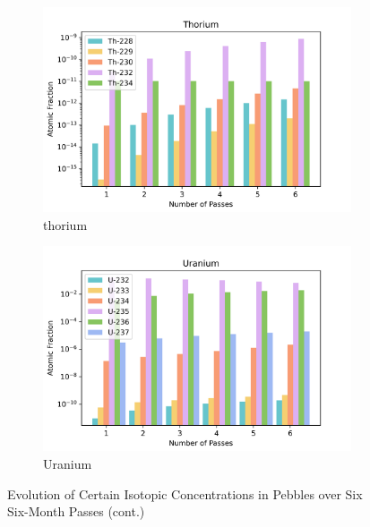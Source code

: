 \begin{figure}[H]\ContinuedFloat
\centering


\begin{subfigure}{0.95\textwidth}
  \includegraphics[width=0.95\linewidth]{figures/compositions/thorium}
  \caption{thorium}
  \label{fig:th}
\end{subfigure}%

\begin{subfigure}{0.95\textwidth}
  \includegraphics[width=0.95\linewidth]{figures/compositions/uranium}
  \caption{Uranium}
  \label{fig:u}
\end{subfigure}%

\caption{Evolution of Certain Isotopic Concentrations in Pebbles over Six Six-Month Passes (cont.)}
\end{figure}

